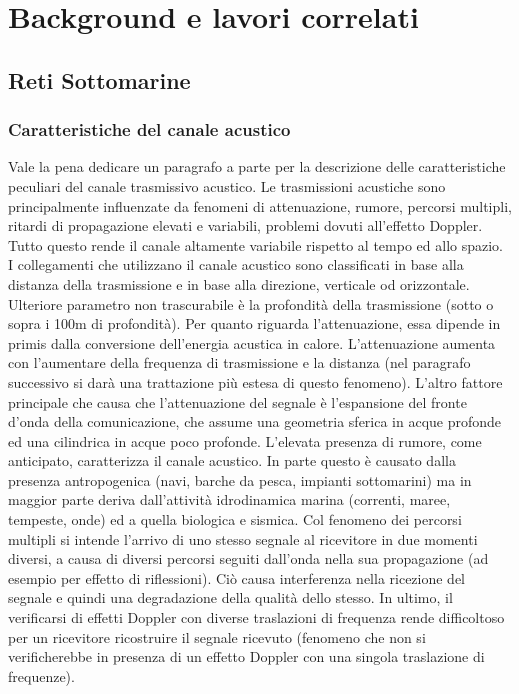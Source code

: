 \documentclass[Lau,binding=0.6cm]{sapthesis}
\begin{document}
\chapter{Background e lavori correlati}

\section{Reti Sottomarine}

\subsection{Caratteristiche del canale acustico}
Vale la pena dedicare un paragrafo a parte per la descrizione delle caratteristiche peculiari del canale trasmissivo acustico. Le trasmissioni acustiche sono principalmente influenzate da fenomeni di attenuazione, rumore, percorsi multipli, ritardi di propagazione elevati e variabili, problemi dovuti all'effetto Doppler.\newline
Tutto questo rende il canale altamente variabile rispetto al tempo ed allo spazio. I collegamenti che utilizzano il canale acustico sono classificati  in base alla distanza della trasmissione e in base alla direzione, verticale od orizzontale. Ulteriore parametro non trascurabile è la profondità della trasmissione (sotto o sopra i 100m di profondità).\newline
Per quanto riguarda l'attenuazione, essa dipende in primis dalla conversione dell'energia acustica in calore. L'attenuazione aumenta con l'aumentare della frequenza di trasmissione e la distanza (nel paragrafo successivo si darà una trattazione più estesa di questo fenomeno). 
L'altro fattore principale che causa che l'attenuazione del segnale è l'espansione del fronte d'onda della comunicazione, che assume una geometria sferica in acque profonde ed una cilindrica in acque poco profonde.\newline
L'elevata presenza di rumore, come anticipato, caratterizza il canale acustico. In parte questo è causato dalla presenza antropogenica (navi, barche da pesca, impianti sottomarini) ma in maggior parte deriva dall'attività idrodinamica marina (correnti, maree, tempeste, onde) ed a quella biologica e sismica.\newline
Col fenomeno dei percorsi multipli si intende l'arrivo di uno stesso segnale al ricevitore in due momenti diversi, a causa di diversi percorsi seguiti dall'onda nella sua propagazione (ad esempio per effetto  di riflessioni). Ciò causa interferenza nella ricezione del segnale e quindi una degradazione della qualità dello stesso.\newline
In ultimo, il verificarsi di effetti Doppler con diverse traslazioni di frequenza rende difficoltoso per un ricevitore ricostruire il segnale ricevuto (fenomeno che non si verificherebbe in presenza di un effetto Doppler con una singola traslazione di frequenze).
\end{document}
